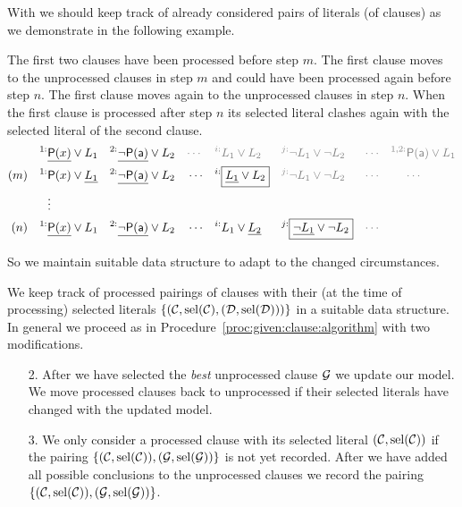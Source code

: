 With \InstGen{} we should keep track of already considered pairs of literals (of clauses) as we demonstrate in the following example.

\begin{example}[InstGen]
	The first two clauses have been processed before step \( m \).
	The first clause moves to the unprocessed clauses in step \( m \)
	and could have been processed again before step \( n \).
	The first clause moves again to the unprocessed clauses in step \( n \).
When the first clause is processed after step \(n \)
its selected literal clashes again with the selected literal of
the second clause.
\begin{align*}
	^{1:}&\underline{\mP(x)}\lor L_1
	&^{2:}&\underline{\lnot\mP(\ma)}\lor L_2
	&&\textcolor{colG}{\cdots}
	&\textcolor{colG}{^{i:}}&\textcolor{colG}{L_1\lor L_2}
	&\textcolor{colG}{^{j:}}&\textcolor{colG}{\lnot L_1\lor\lnot L_2}
	&&\textcolor{colG}{\cdots}
	&\textcolor{colG}{^{1,2:}}&\textcolor{colG}{\mP(\ma)\lor L_1}
	\\
	(m)\quad
	^{1:}&\mP(x)\lor \underline{L_1}
	&^{2:}&\underline{\lnot\mP(\ma)}\lor L_2
	&&\cdots
	&^{i:}&\boxed{\underline{L_1}\lor L_2}
	&\textcolor{colG}{^{j:}}&\textcolor{colG}{\lnot L_1\lor\lnot L_2}
	&&\textcolor{colG}{\cdots}
	&&\textcolor{colG}{\cdots}
	\\
	&\vdots
	\\
	(n)\quad
	^{1:}&\underline{\mP(x)}\lor {L_1} &
	^{2:}&\underline{\lnot\mP(\ma)}\lor L_2 &
	&\cdots&
	^{i:}&{L_1}\lor \underline{L_2} &
	^{j:}&\boxed{\underline{\lnot L_1}\lor \lnot L_2} &
	&\textcolor{colG}{\cdots}
\end{align*}
\end{example}

\noindent
So we maintain suitable data structure to adapt to the changed circumstances.

\begin{procedure}
	We keep track of processed pairings of clauses
	 with their (at the time of processing) selected literals
	 \( \{ (\mathcal{C}, \operatorname{sel}(\mathcal{C}), (\mathcal{D},\operatorname{sel}(\mathcal{D}))) \} \)
	 in a suitable data structure.
	In general we proceed as in Procedure~\vref{proc:given:clause:algorithm}
	with two modifications.

	\begin{enumerate}
		\item[2.]
		After we have selected the \emph{best} unprocessed clause \( \mathcal{G} \)
		we update our model. We move processed clauses back to unprocessed
		if their selected literals have changed with the updated model.
		\item[3.]
		We only consider a processed clause with its selected literal \( (\mathcal{C}, \operatorname{sel}(\mathcal{C})) \)
		if the pairing \( \{ (\mathcal{C}, \operatorname{sel}(\mathcal{C})), (\mathcal{G}, \operatorname{sel}(\mathcal{G})) \} \)
		is not yet recorded.
		After we have added all possible conclusions
		to the unprocessed clauses we record
		the pairing \( \{ (\mathcal{C}, \operatorname{sel}(\mathcal{C})), (\mathcal{G}, \operatorname{sel}(\mathcal{G})) \} \).

	\end{enumerate}



\end{procedure}

